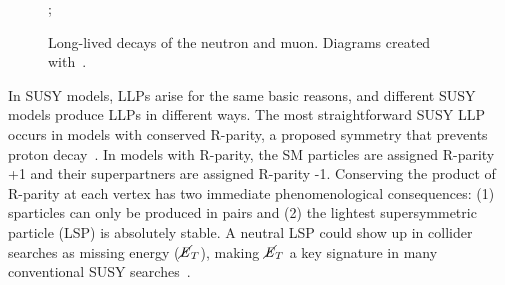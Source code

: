 \documentclass[12pt]{article}
\begin{document}
        \noindent \begin{figure}[htbp] \begin{center}
            \qquad\qquad
            ;
            \caption{Long-lived decays of the neutron and muon. Diagrams created with~\cite{tikz}.}
            \label{sm_llp_processes}
        \end{center} \end{figure}

    In SUSY models, LLPs arise for the same basic reasons, and different SUSY models produce LLPs in different ways. The most straightforward SUSY LLP occurs in models with conserved R-parity, a proposed symmetry that prevents proton decay~\cite{primer}. In models with R-parity, the SM particles are assigned R-parity +1 and their superpartners are assigned R-parity -1. Conserving the product of R-parity at each vertex has two immediate phenomenological consequences: (1) sparticles can only be produced in pairs and (2) the lightest supersymmetric particle (LSP) is absolutely stable. A neutral LSP could show up in collider searches as missing energy ($\cancel{\it{E}}_{T}$), making $\cancel{\it{E}}_{T}$ a key signature in many conventional SUSY searches~\cite{primer}.
\end{document}
